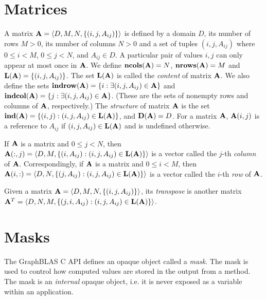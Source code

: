 \section{Matrices}
\label{Sec:Matrices}

A matrix ${\bf A} = \langle D, M, N, \{ (i,j,A_{ij}) \} \rangle$ is
defined by a domain $D$, its number of rows $M>0$, its number of columns
$N>0$ and a set of tuples $(i,j,A_{ij})$ where $0 \leq i < M$, $0 \leq
j < N$, and $A_{ij} \in D$. A particular pair of values $i,j$ can only
appear at most once in ${\bf A}$. We define $\bold{ncols}({\bf A})
= N$,  $\bold{nrows}({\bf A}) = M$ and $\bold{L}({\bf A}) =
\{ (i,j,A_{ij}) \}$.  The set $\bold{L}({\bf A})$ is called the
\emph{content} of matrix ${\bf A}$.  We also define the sets
${\bf indrow({\bf A})} = \{ i : \exists (i,j,A_{ij}) \in
{\bf A} \}$ and ${\bf indcol({\bf A})} = \{ j : \exists
(i,j,A_{ij}) \in {\bf A} \}$.  (These are the sets of nonempty
rows and columns of ${\bf A}$, respectively.)  The \emph{structure}
of matrix ${\bf A}$ is the set $\bold{ind}({\bf A}) = \{ (i,j) :
(i,j,A_{ij}) \in \bold{L}({\bf A}) \}$, and $\bold{D}({\bf A}) = D$.
For a matrix ${\bf A}$, ${\bf A}(i,j)$ is a reference to $A_{ij}$
if $(i,j,A_{ij}) \in \bold{L}({\bf A})$ and is undefined otherwise.

If ${\bf A}$ is a matrix and $0 \leq j < N$, then ${\bf A}(:,j)
= \langle D, M, \{(i,A_{ij}) : (i,j,A_{ij}) \in \bold{L}({\bf A})
\} \rangle$ is a vector called the $j$-th \emph{column}
of ${\bf A}$. Correspondingly, if ${\bf A}$ is a matrix and
$0 \leq i < M$, then ${\bf A}(i,:) = \langle D, N, \{(j,A_{ij}) :
(i,j,A_{ij}) \in \bold{L}({\bf A}) \} \rangle$ is a vector called
the $i$-th \emph{row} of ${\bf A}$.

Given a matrix ${\bf A} = \langle D, M, N, \{ (i,j,A_{ij}) \} \rangle$,
its \emph{transpose} is another matrix ${\bf A}^T = \langle D, N, M, \{
(j,i,A_{ij}) : (i,j,A_{ij}) \in \bold{L}({\bf A}) \} \rangle$.

\section{Masks}
\label{Sec:Masks}

The GraphBLAS C API defines an opaque object called a \emph{mask}.  The mask
is used to control how computed values are stored in the output from a method. 
The mask is an \emph{internal} opaque object, i.e. it is never exposed as a variable
within an application. 

